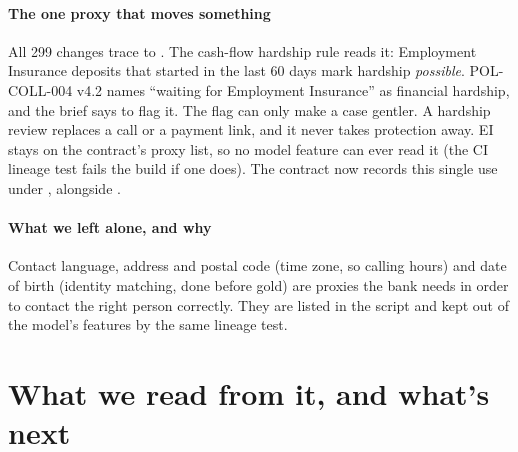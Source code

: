 \documentclass[11pt]{article}
\begin{document}
\paragraph{The one proxy that moves something} All 299 changes trace to . The cash-flow hardship rule
reads it: Employment Insurance deposits that started in the last 60 days mark hardship \emph{possible}. POL-COLL-004 v4.2 names
``waiting for Employment Insurance'' as financial hardship, and the brief says to flag it. The flag can only make a case
gentler. A hardship review replaces a call or a payment link, and it never takes protection away. EI stays on the contract's
proxy list, so no model feature can ever read it (the CI lineage test fails the build if one does). The contract now records this
single use under , alongside .

\paragraph{What we left alone, and why} Contact language, address and postal code (time zone, so calling hours) and date of birth
(identity matching, done before gold) are proxies the bank needs in order to contact the right person correctly. They are listed
in the script and kept out of the model's features by the same lineage test.


\section{What we read from it, and what's next}
\end{document}

